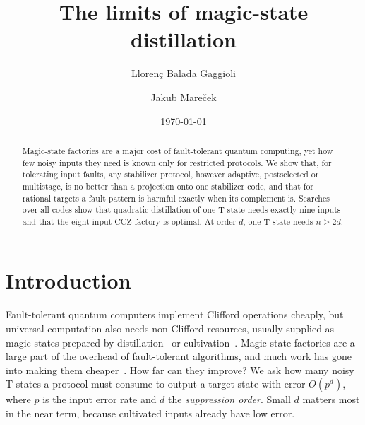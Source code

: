 \documentclass[aps,prl,reprint,twocolumn,amsmath,amssymb,floatfix,nofootinbib,superscriptaddress]{revtex4-2}
\begin{document}
\title{The limits of magic-state distillation}
\author{Lloren\c{c} Balada Gaggioli}
\author{Jakub Mare\v{c}ek}
\date{\today}
\begin{abstract}
Magic-state factories are a major cost of fault-tolerant quantum computing, yet how few noisy inputs they need is known only for restricted protocols. We show that, for tolerating input faults, any stabilizer protocol, however adaptive, postselected or multistage, is no better than a projection onto one stabilizer code, and that for rational targets a fault pattern is harmful exactly when its complement is. Searches over all codes show that quadratic distillation of one T state needs exactly nine inputs and that the eight-input CCZ factory is optimal. At order $d$, one T state needs $n\geq2d$.
\end{abstract}
\maketitle

%
\section{Introduction}
Fault-tolerant quantum computers implement Clifford operations cheaply, but universal computation also needs non-Clifford resources, usually supplied as magic states prepared by distillation~\cite{bravyikitaev,bravyihaah} or cultivation~\cite{cultivation,googlecultivation}. Magic-state factories are a large part of the overhead of fault-tolerant algorithms, and much work has gone into making them cheaper~\cite{litinski,gidneyfowler,campbellhoward,eastin,jones,haah,borrowed,jacinto,wjs,gong}. How far can they improve? We ask how many noisy T states a protocol must consume to output a target state with error $O(p^d)$, where $p$ is the input error rate and $d$ the \emph{suppression order}. Small $d$ matters most in the near term, because cultivated inputs already have low error.
\end{document}
